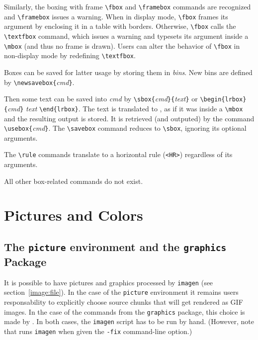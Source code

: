 Similarly, the boxing with frame \verb+\fbox+ and \verb+\framebox+
commands are recognized and
\verb+\framebox+ issues a warning.
When in display mode, \verb+\fbox+ frames its argument by
enclosing it in a
table with borders. Otherwise, \verb+\fbox+ calls the \verb+\textfbox+
command, which issues a warning and typesets its argument
inside a \verb+\mbox+ (and thus no frame is drawn).
Users can alter the behavior of \verb+\fbox+ in non-display mode by
redefining \verb+\textfbox+.



Boxes can be saved for latter usage by storing them in {\em bins}.
New bins are defined by \verb+\newsavebox{+{\it cmd}\verb+}+.

Then some text can be saved into {\it cmd} by
\verb+\sbox{+{\it cmd}\verb+}{+{\it text}\verb+}+ or
\verb+\begin{lrbox}{+\textit{cmd}\verb+}+ \textit{text} \verb+\end{lrbox}+.
The text is translated to \html{}, as if it was inside a \verb+\mbox+
and the resulting output is stored.
It is retrieved (and outputed) by the command
\verb+\usebox{+{\it cmd}\verb+}+.
The \verb+\savebox+ command reduces to \verb+\sbox+, ignoring its
optional arguments.

The \verb+\rule+ commands translate to a \html{} horizontal rule
(\verb+<HR>+)  regardless of its arguments.


All other box-related commands do not exist.

\section{Pictures and Colors}

\subsection{The \texttt{picture} environment and the \texttt{graphics}
Package}

It is possible to have pictures and graphics processed by
\texttt{imagen} (see section~\ref{image:file}).
In the case of the \texttt{picture} environment
it remains users responsability to explicitly choose
source chunks that will get rendered as GIF images.
In the case of the commands from the \texttt{graphics} package,
this choice is made by \hevea.
In both cases, the \texttt{imagen} script has to be run by hand.
(However, note that \hevea{} runs \texttt{imagen} when given the
\verb+-fix+ command-line option.)

